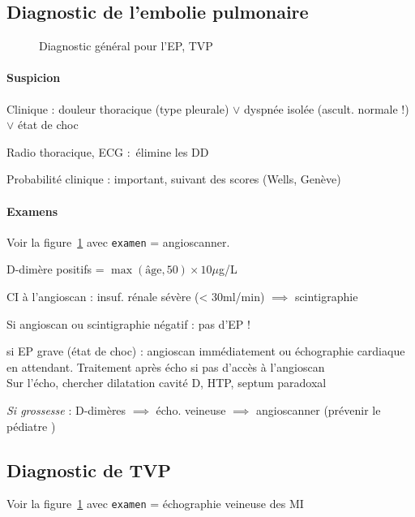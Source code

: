\documentclass{article}
\begin{document}
\subsection{Diagnostic de l'embolie pulmonaire}
\begin{figure}[htpb]
  \label{fig:ep-diag}
  \centering
  \caption{Diagnostic général pour l'EP, TVP}
\end{figure}


\paragraph{Suspicion}
Clinique : douleur thoracique (type pleurale) $\vee$ dyspnée isolée (ascult.
normale !) $\vee$ état de choc

Radio thoracique, ECG : élimine les DD

Probabilité clinique : important, suivant des scores (Wells, Genève)

\paragraph{Examens}
Voir la figure~\ref{fig:ep-diag} avec \texttt{examen} = angioscanner.

D-dimère positifs = $\max(\text{âge}, 50) \times 10 \mu{}$g/L

CI à l'angioscan : insuf. rénale sévère (< 30ml/min) $\implies$ scintigraphie

Si angioscan ou scintigraphie négatif : pas d'EP !

\danger{} si EP grave (état de choc) : angioscan immédiatement ou échographie
cardiaque en attendant. Traitement après écho si pas d'accès à l'angioscan
\skull\\
Sur l'écho, chercher dilatation cavité D, HTP, septum paradoxal

\textit{Si grossesse}  : D-dimères $\implies$ écho. veineuse $\implies$ angioscanner
(prévenir le pédiatre \skull)

\subsection{Diagnostic de TVP}
Voir la figure~\ref{fig:ep-diag} avec \texttt{examen} = échographie veineuse
des MI
\end{document}
